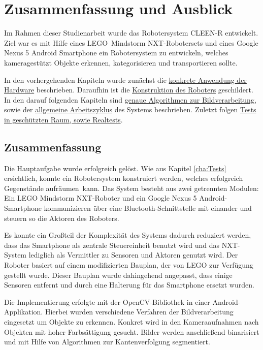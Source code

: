 \chapter{Zusammenfassung und Ausblick}
\label{cha:Fazit}

Im Rahmen dieser Studienarbeit wurde das Robotersystem CLEEN-R entwickelt. Ziel war es mit Hilfe eines LEGO\textregistered\ Mindstorm NXT-Robotersets und eines Google Nexus 5 Android Smartphone ein Robotersystem zu entwickeln, welches kameragestützt Objekte erkennen, kategorisieren und transportieren sollte. 

In den vorhergehenden Kapiteln wurde zunächst die \hyperref[cha:Materials]{konkrete Anwendung der Hardware}  beschrieben. Daraufhin ist die \hyperref[cha:robot]{Konstruktion des Roboters} geschildert. In den darauf folgenden Kapiteln sind \hyperref[cha:Software]{genaue Algorithmen zur Bildverarbeitung}, sowie der \hyperref[cha:Workloop]{allgemeine Arbeitszyklus} des Systems beschrieben. Zuletzt folgen \hyperref[cha:Tests]{Tests in geschützten Raum, sowie Realtests}.

\section{Zusammenfassung}

Die Hauptaufgabe wurde erfolgreich gelöst. Wie aus Kapitel \ref{cha:Tests} ersichtlich, konnte ein Robotersystem konstruiert werden, welches erfolgreich Gegenstände \glqq aufräumen\grqq\ kann. Das System besteht aus zwei getrennten Modulen: Ein LEGO Mindstorm NXT-Roboter und ein Google Nexus 5 Android-Smartphone kommunizieren über eine Bluetooth-Schnittstelle mit einander und steuern so die Aktoren des Roboters. 

Es konnte ein Großteil der Komplexität des Systems dadurch reduziert werden, dass das Smartphone als zentrale Steuereinheit benutzt wird und das NXT-System lediglich als Vermittler zu Sensoren und Aktoren genutzt wird. Der Roboter basiert auf einem modifizierten Bauplan, der von LEGO zur Verfügung gestellt wurde. Dieser Bauplan wurde dahingehend angepasst, dass einige Sensoren entfernt und durch eine Halterung für das Smartphone ersetzt wurden.

Die Implementierung erfolgte mit der OpenCV-Bibliothek in einer Android-Applikation. Hierbei wurden verschiedene Verfahren der Bildverarbeitung eingesetzt um Objekte zu erkennen. Konkret wird in den Kameraaufnahmen nach Objekten mit hoher Farbsättigung gesucht. Bilder werden anschließend binarisiert und mit Hilfe von Algorithmen zur Kantenverfolgung segmentiert. 

